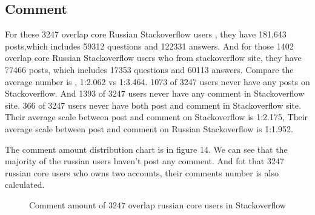 \documentclass[A4paper,twoside,twocolumn]{article}
\begin{document}
\subsection{Comment}

For these 3247 overlap core Russian Stackoverflow users , they have 181,643 posts,which includes 59312 questions and 122331 answers. And for those 1402 overlap core Russian Stackoverflow users who from stackoverflow site, they have 77466 posts, which includes 17353 questions and 60113 answers. Compare the average number is , 1:2.062 vs 1:3.464. 1073 of 3247 users never have any posts on Stackoverflow. And 1393 of 3247 users never have any comment in Stackoverflow site. 366 of 3247 users never have both post and comment in Stackoverflow site. Their average scale between post and comment on Stackoverflow is 1:2.175, Their average scale between post and comment on Russian Stackoverflow is 1:1.952.

The comment amount distribution chart is in figure 14. We can see that the majority of the russian users haven't post any comment. And fot that 3247 russian core users who owns two accounts, their comments number is also calculated.
\begin{figure}[H]
	\centering 
	\caption{Comment amount of 3247 overlap russian core users in Stackoverflow}		
\end{figure}
\end{document}
